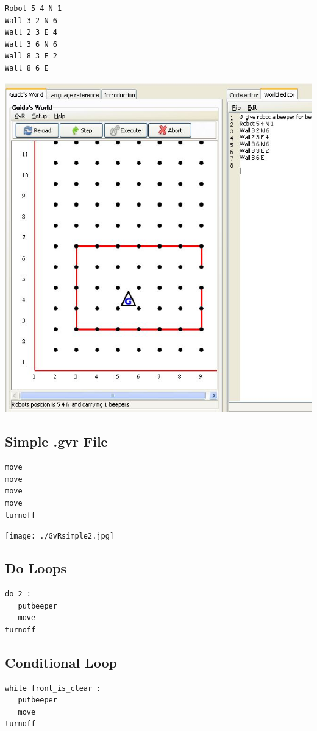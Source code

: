 \begin{verbatim}
Robot 5 4 N 1
Wall 3 2 N 6
Wall 2 3 E 4
Wall 3 6 N 6
Wall 8 3 E 2
Wall 8 6 E
\end{verbatim}
\begin{center}
\includegraphics[scale=0.5]{../Pictures/GvRsimple1.jpg}
\end{center}

\subsection*{\bf Simple .gvr File}
\begin{verbatim}
move
move
move
move
turnoff
\end{verbatim}
\begin{center}
\texttt{[image: ./GvRsimple2.jpg]}
\end{center}


\subsection*{Do Loops}
\begin{verbatim}
do 2 :
   putbeeper
   move
turnoff
\end{verbatim}

\subsection*{Conditional Loop}
\begin{verbatim}
while front_is_clear :
   putbeeper
   move
turnoff
\end{verbatim}

